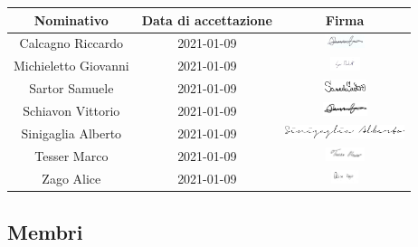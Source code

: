 \begin{center}
	\begin{longtable}{| c | c | c |}
		\hline
		\rowcolor[HTML]{F9CB9C} 
		\textbf{Nominativo} & \textbf{Data di accettazione} & \textbf{Firma}  \\ \hline
		Calcagno Riccardo & 2021-01-09   &  
		\includegraphics[width=3.5cm, height=0.4cm]{./res/images/RCfirma.jpg}
		\\ \hline
		Michieletto Giovanni &  2021-01-09  &  
		\includegraphics[width=3.5cm, height=0.4cm]{./res/images/GMfirma.jpg}
		\\ \hline
		Sartor Samuele &  2021-01-09  & 
		\includegraphics[width=3.5cm, height=0.4cm]{./res/images/SSfirma.jpg}
		\\ \hline
		Schiavon Vittorio &  2021-01-09  &
		\includegraphics[width=3.5cm, height=0.4cm]{./res/images/VSfirma.jpg}
		\\ \hline
		Sinigaglia Alberto & 2021-01-09   &  
		\includegraphics[width=3.5cm, height=0.4cm]{./res/images/ASfirma.jpg}
		\\ \hline 
		Tesser Marco &  2021-01-09  & 
		\includegraphics[width=3.5cm, height=0.4cm]{./res/images/MTfirma.jpg}
		\\ \hline
		Zago Alice &  2021-01-09  &  
		\includegraphics[width=3.5cm, height=0.4cm]{./res/images/AZfirma.jpg}
	    \\ \hline  
	\end{longtable}
\end{center}

\break

\subsection{Membri}

